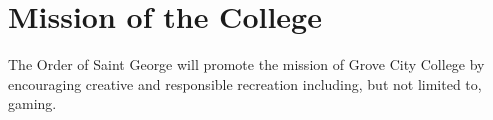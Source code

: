 {
\section{Mission of the College}
The Order of Saint George will promote the mission of Grove City College by encouraging creative and responsible recreation including, but not limited to, gaming.
}